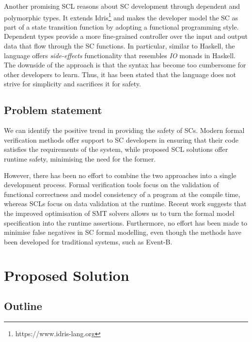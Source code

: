 \documentclass[oneside]{ecsproject}     %
\begin{document}
Another promising SCL reasons about SC development through dependent and polymorphic types\cite{idris}. It extends Idris\footnote{https://www.idris-lang.org} 
and makes the developer model the SC as part of a state transition function by adopting a functional programming style. Dependent types provide a more
fine-grained controller over the input and output data that flow through the SC functions. In particular, similar to Haskell, the language offers \textit{side-effects} 
functionality that resembles \textit{IO} monads in Haskell. The downside of the approach is that the syntax has become too cumbersome for other developers to learn. Thus,
it has been stated that the language does not strive for simplicity and sacrifices it for safety.


\section{Problem statement}

We can identify the positive trend in providing the safety of SCs.
Modern formal verification methods offer support to SC developers in ensuring that their code satisfies the requirements of the system, while
proposed SCL solutions offer runtime safety, minimising the need for the former.

However, there has been no effort to combine the two approaches into a single development process. Formal verification tools
focus on the validation of functional correctness and model consistency of a program at the compile time, whereas SCLs focus on data validation 
at the runtime. Recent work suggests that the improved optimisation of SMT solvers allows us to turn the formal model specification into 
the runtime assertions\cite{runtime_assert}. Furthermore, no effort has been made to minimise false negatives in SC formal modelling, 
even though the methods have been developed for traditional systems, such as Event-B\cite{event_b}.


\chapter{Proposed Solution} \label{Chapter:Solution}

\section{Outline}
\end{document}
